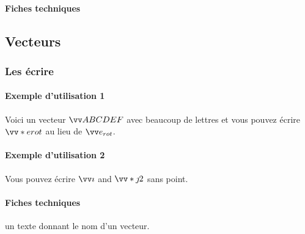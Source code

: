 \documentclass[12pt,a4paper]{article}
\theoremstyle{definition}
\begin{document}
\paragraph{Fiches techniques}










\subsection{Vecteurs}

\subsubsection{Les écrire}

\paragraph{Exemple d'utilisation 1}

\begin{tcblisting}{}
Voici un vecteur $\vect{ABCDEF}$ avec beaucoup de lettres et vous pouvez écrire
$\vect*{e}{rot}$ au lieu de $\vect{e_{rot}}$.
\end{tcblisting}


\paragraph{Exemple d'utilisation 2}

\begin{tcblisting}{}
Vous pouvez écrire $\vect{i}$ and $\vect*{j}{2}$ sans point.
\end{tcblisting}



\paragraph{Fiches techniques}


\IDarg{} un texte donnant le nom d'un vecteur.
\end{document}
